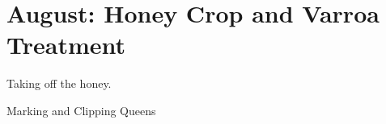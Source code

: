 \section{August: Honey Crop and Varroa Treatment}

Taking off the honey.

Marking and Clipping Queens